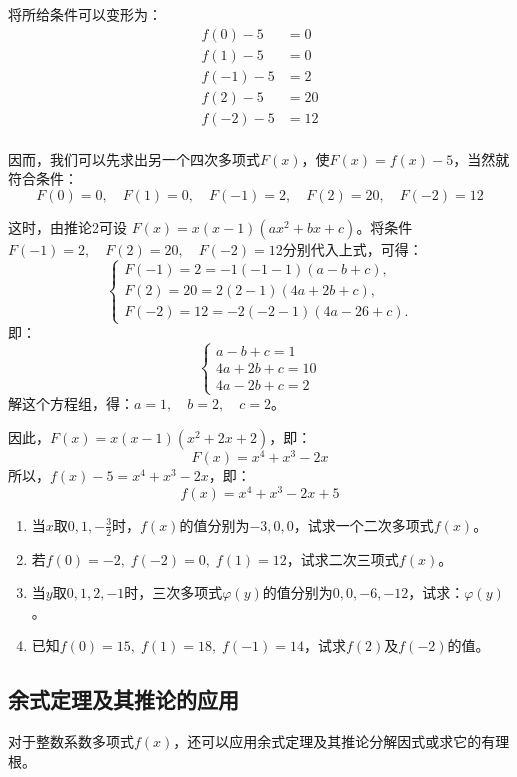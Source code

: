 \begin{solution}
    将所给条件可以变形为：  
\[\begin{split}
    f(0)-5&=0\\
    f(1)-5&=0\\
    f(-1)-5&=2\\
    f(2)-5&=20\\
    f(-2)-5&=12\\
\end{split}\]

因而，我们可以先求出另一个四次多项式$F(x)$，使$F(x)=f(x)-5$，当然就符合条件：
\[F(0)=0,\quad F (1) =0,\quad  F (-1) =2,\quad F (2) =20,\quad  F (-2) =12\]

这时，由推论2可设
$F (x) =x (x-1) (ax^2+bx+c)$。将条件$F(-1)=2,\quad F(2)=20,\quad F(-2)=12$分别代入上式，可得：
\[\begin{cases}
    F (-1) =2=-1 (-1-1) (a-b+c),\\
    F (2) =20=2 (2-1) (4a+2b+c),\\
    F (-2) =12=-2 (-2-1) (4a-26+c). 
\end{cases}\]
即：\[\begin{cases}
    a-b+c=1\\
4a+2b+c=10\\
4a-2b+c=2
\end{cases}\]
解这个方程组，得：$a=1,\quad b=2,\quad c=2$。

因此，$F(x)=x(x-1)(x^2+2x+2)$，即：
\[F(x)=x^4+x^3-2x\]
所以，$f(x)-5=x^4+x^3-2x$，即：
\[f(x)=x^4+x^3-2x+5\]
\end{solution}

\begin{ex}
\begin{enumerate}
    \item 当$x$取$0,1,-\frac{3}{2}$时，$f(x)$的值分别为$-3,0,0$，试求一个二次多项式$f(x)$。
\item 若$f(0)=-2,\; f(-2)=0,\; f(1)=12$，试求二次三项式$f(x)$。
\item 当$y$取$0, 1, 2,-1$时，三次多项式$\varphi(y)$的值分别为$0, 0,-6,-12$，试求：$\varphi(y)$。
\item 已知$f(0)=15,\; f(1)=18,\; f(-1)=14$，试求$f(2)$及$f(-2)$的值。
\end{enumerate}
\end{ex}

\subsection{余式定理及其推论的应用}
对于整数系数多项式$f(x)$，还可以应用余式定理及其推论分解因式或求它的有理根。

